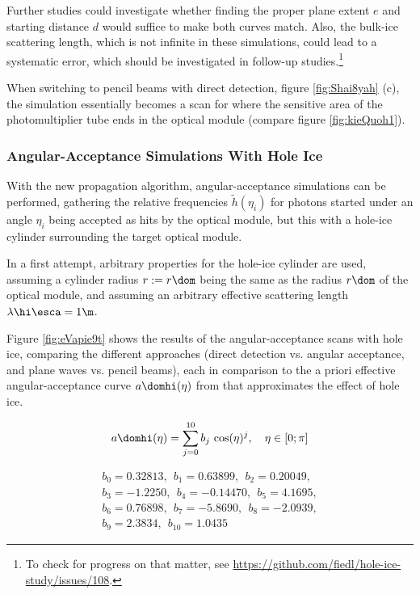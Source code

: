 Further studies could investigate whether finding the proper plane extent $e$ and starting distance $d$ would suffice to make both curves match. Also, the bulk-ice scattering length, which is not infinite in these simulations, could lead to a systematic error, which should be investigated in follow-up studies.\footnote{To check for progress on that matter, see \url{https://github.com/fiedl/hole-ice-study/issues/108}.}\followup

When switching to pencil beams with direct detection, figure \ref{fig:Shai8yah} (c), the simulation essentially becomes a scan for where the sensitive area of the photomultiplier tube ends in the optical module (compare figure \ref{fig:kieQuoh1}).


\subsubsection{Angular-Acceptance Simulations With Hole Ice}
\label{sec:angular_acceptance_simulations_with_hole_ice}\label{sec:hole_ice_approximation}
With the new propagation algorithm, angular-acceptance simulations can be performed, gathering the relative frequencies $\tilde{h}(\eta_i)$ for photons started under an angle $\eta_i$ being accepted as hits by the optical module, but this with a hole-ice cylinder surrounding the target optical module.

In a first attempt, arbitrary properties for the hole-ice cylinder are used, assuming a cylinder radius $r:=r\dom$ being the same as the radius $r\dom$ of the optical module, and assuming an arbitrary effective scattering length $\lambda\hi\esca = 1\m$.


Figure \ref{fig:eVapie9t} shows the results of the angular-acceptance scans with hole ice, comparing the different approaches (direct detection vs. angular acceptance, and plane waves vs. pencil beams), each in comparison to the a priori effective angular-acceptance curve $a\domhi(\eta)$ from \cite{icepaper} that approximates the effect of hole ice.

\begin{equation}
  a\domhi(\eta) = \sum_{j = 0}^{10} b_j\,\cos(\eta)^j, \ \ \ \eta \in [0; \pi]
  \label{eq:aholeice}
\end{equation}

\begin{gather*}
  b_0 = 0.32813, \ \ b_1 = 0.63899, \ \ b_2 = 0.20049, \\
  b_3 = -1.2250, \ \ b_4 = -0.14470, \ \ b_5 = 4.1695, \\
  b_6 = 0.76898, \ \ b_7 = -5.8690, \ \ b_8 = -2.0939, \\
  b_9 = 2.3834, \ \ b_{10} = 1.0435
\end{gather*}

